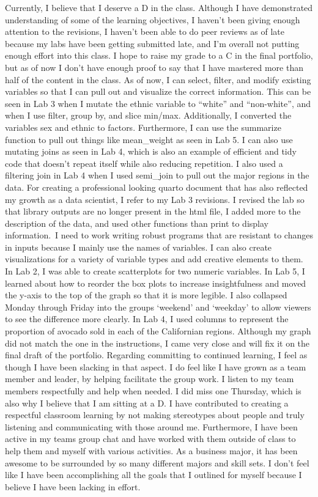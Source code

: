 \documentclass[
  letterpaper,
  DIV=11,
  numbers=noendperiod]{scrartcl}
\begin{document}
Currently, I believe that I deserve a D in the class. Although I have
demonstrated understanding of some of the learning objectives, I haven't
been giving enough attention to the revisions, I haven't been able to do
peer reviews as of late because my labs have been getting submitted
late, and I'm overall not putting enough effort into this class. I hope
to raise my grade to a C in the final portfolio, but as of now I don't
have enough proof to say that I have mastered more than half of the
content in the class. As of now, I can select, filter, and modify
existing variables so that I can pull out and visualize the correct
information. This can be seen in Lab 3 when I mutate the ethnic variable
to ``white'' and ``non-white'', and when I use filter, group by, and
slice min/max. Additionally, I converted the variables sex and ethnic to
factors. Furthermore, I can use the summarize function to pull out
things like mean\_weight as seen in Lab 5. I can also use mutating joins
as seen in Lab 4, which is also an example of efficient and tidy code
that doesn't repeat itself while also reducing repetition. I also used a
filtering join in Lab 4 when I used semi\_join to pull out the major
regions in the data. For creating a professional looking quarto document
that has also reflected my growth as a data scientist, I refer to my Lab
3 revisions. I revised the lab so that library outputs are no longer
present in the html file, I added more to the description of the data,
and used other functions than print to display information.~I need to
work writing robust programs that are resistant to changes in inputs
because I mainly use the names of variables. I can also create
visualizations for a variety of variable types and add creative elements
to them. In Lab 2, I was able to create scatterplots for two numeric
variables. In Lab 5, I learned about how to reorder the box plots to
increase insightfulness and moved the y-axis to the top of the graph so
that it is more legible. I also collapsed Monday through Friday into the
groups `weekend' and `weekday' to allow viewers to see the difference
more clearly. In Lab 4, I used columns to represent the proportion of
avocado sold in each of the Californian regions. Although my graph did
not match the one in the instructions, I came very close and will fix it
on the final draft of the portfolio. Regarding committing to continued
learning, I feel as though I have been slacking in that aspect. I do
feel like I have grown as a team member and leader, by helping
facilitate the group work. I listen to my team members respectfully and
help when needed. I did miss one Thursday, which is also why I believe
that I am sitting at a D. I have contributed to creating a respectful
classroom learning by not making stereotypes about people and truly
listening and communicating with those around me. Furthermore, I have
been active in my teams group chat and have worked with them outside of
class to help them and myself with various activities. As a business
major, it has been awesome to be surrounded by so many different majors
and skill sets. I don't feel like I have been accomplishing all the
goals that I outlined for myself because I believe I have been lacking
in effort.
\end{document}
